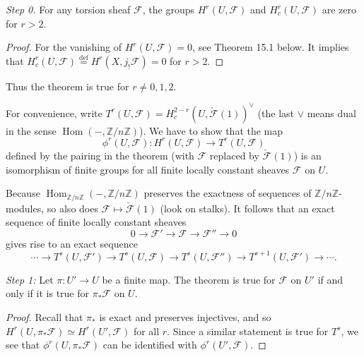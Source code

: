 \documentclass[11pt]{article}
\newcommand{\Z}{\mathbb Z}
\newcommand{\F}{\mathcal F}
\newcommand{\Hom}{\operatorname{Hom}}
\newcommand{\step}[1]{\par\medskip\noindent\textit{#1}\quad}
\begin{document}
\step{Step 0.} For any torsion sheaf $\F$, the groups $H^r(U,\F)$ and $H_c^r(U,\F)$ are zero for $r>2$.
\begin{proof}
For the vanishing of $H^r(U,\F)=0$, see Theorem 15.1 below. It implies that $H_c^r(U,\F)\overset{\mathrm{def}}=H^r(X,j_!\F)=0$ for $r>2$.
\end{proof}
Thus the theorem is true for $r\ne0,1,2$.

For convenience, write $T^r(U,\F)=H_c^{2-r}(U,\check{\F}(1))^\vee$ (the last $\vee$ means dual in the sense $\Hom(-,\Z/n\Z)$). We have to show that the map
\[
\phi^r(U,\F)\colon H^r(U,\F)\longrightarrow T^r(U,\F)
\]
defined by the pairing in the theorem (with $\F$ replaced by $\check{\F}(1)$) is an isomorphism of finite groups for all finite locally constant sheaves $\F$ on $U$.

Because $\Hom_{\Z/n\Z}(-,\Z/n\Z)$ preserves the exactness of sequences of $\Z/n\Z$-modules, so also does $\F\mapsto\check{\F}(1)$ (look on stalks). It follows that an exact sequence of finite locally constant sheaves
\[
0\longrightarrow\F'\longrightarrow\F\longrightarrow\F''\longrightarrow0
\]
gives rise to an exact sequence
\[
\cdots\longrightarrow T^s(U,\F')\longrightarrow T^s(U,\F)
\longrightarrow T^s(U,\F'')\longrightarrow T^{s+1}(U,\F')\longrightarrow\cdots.
\]

\step{Step 1:} Let $\pi\colon U'\to U$ be a finite map. The theorem is true for $\F$ on $U'$ if and only if it is true for $\pi_*\F$ on $U$.
\begin{proof}
Recall that $\pi_*$ is exact and preserves injectives, and so $H^r(U,\pi_*\F)\simeq H^r(U',\F)$ for all $r$. Since a similar statement is true for $T^s$, we see that $\phi^r(U,\pi_*\F)$ can be identified with $\phi^r(U',\F)$.
\end{proof}
\end{document}
